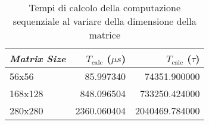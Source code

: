 \begin{table}[!t]
  \centering
  \begin{tabular}{|l|r|r|}
    \hline
    \emph{Matrix Size} & $T_{\textrm{calc}}$ ($\mu s$) & $T_{\textrm{calc}}$ (\emph{$\tau$}) \\
    \hline
    56x56 & 85.997340 & 74351.900000 \\
    168x128 & 848.096504 & 733250.424000 \\
    280x280 & 2360.060404 & 2040469.784000 \\
    \hline
  \end{tabular}
  \caption{Tempi di calcolo della computazione sequenziale al variare della dimensione della matrice}
  \label{tab:Tcalc}
\end{table}

